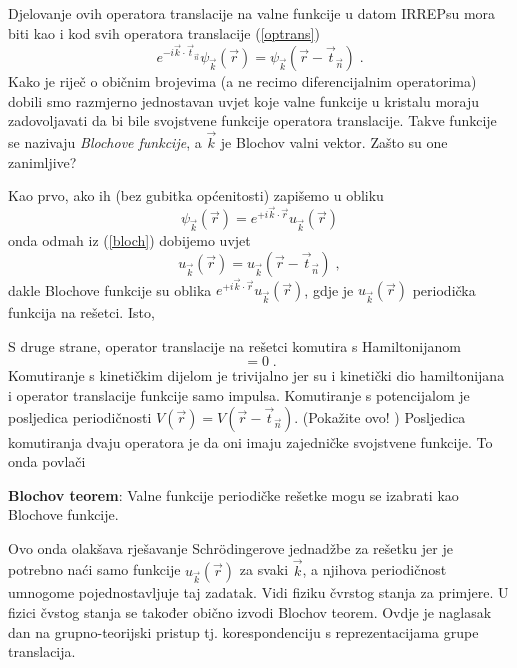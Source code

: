 Djelovanje ovih operatora translacije na valne funkcije u datom
IRREPsu mora biti kao i kod svih operatora translacije (\ref{optrans})
\begin{equation}
 e^{-i \vec{k}\cdot \vec{t}_{\vec{n}}} \psi_{\vec{k}}(\vec{r}) =
\psi_{\vec{k}}(\vec{r} - \vec{t}_{\vec{n}}) \;.
\label{bloch}
\end{equation}
Kako je riječ o običnim brojevima (a ne recimo diferencijalnim
operatorima) dobili smo razmjerno jednostavan uvjet koje valne funkcije
u kristalu moraju zadovoljavati da bi bile svojstvene funkcije operatora
translacije. Takve funkcije se nazivaju \emph{Blochove funkcije}, a
$\vec{k}$ je Blochov valni vektor.
Zašto su one zanimljive?

Kao prvo, ako ih (bez gubitka općenitosti) zapišemo u obliku
\begin{equation}
 \psi_{\vec{k}}(\vec{r}) = e^{+i \vec{k}\cdot \vec{r}} u_{\vec{k}}(\vec{r})
\end{equation}
onda odmah iz (\ref{bloch}) dobijemo uvjet 
\begin{equation}
  u_{\vec{k}}(\vec{r}) = u_{\vec{k}}(\vec{r} - \vec{t}_{\vec{n}})  \;,
\end{equation}
dakle Blochove funkcije su oblika 
$e^{+i \vec{k}\cdot \vec{r}} u_{\vec{k}}(\vec{r})$,
gdje je $u_{\vec{k}}(\vec{r})$ periodička funkcija na rešetci. Isto,

S druge strane, operator translacije na rešetci komutira s Hamiltonijanom
\begin{equation}
    [H, U_{r}^{(\vec{k})} (\vec{t}_{\vec{n}}) ] = 0 \;.
\end{equation}
Komutiranje s kinetičkim dijelom je trivijalno jer su i kinetički dio
hamiltonijana i operator translacije funkcije samo impulsa. 
Komutiranje s potencijalom
je posljedica periodičnosti $V(\vec{r}) = V(\vec{r}-\vec{t}_{\vec{n}})$.
(Pokažite ovo! )
Posljedica komutiranja dvaju operatora je da oni imaju zajedničke
svojstvene funkcije. To onda povlači

\textbf{Blochov teorem}: Valne funkcije periodičke rešetke mogu se
izabrati kao Blochove funkcije.

Ovo onda olakšava rješavanje Schr\"{o}dingerove jednadžbe
za rešetku jer je potrebno naći samo funkcije $u_{\vec{k}}(\vec{r})$ za
svaki $\vec{k}$,
a njihova periodičnost umnogome pojednostavljuje taj zadatak.
Vidi fiziku čvrstog stanja za primjere. U fizici čvstog stanja se
također obično izvodi Blochov teorem. Ovdje je naglasak dan
na grupno-teorijski pristup tj. korespondenciju s reprezentacijama
grupe translacija.



